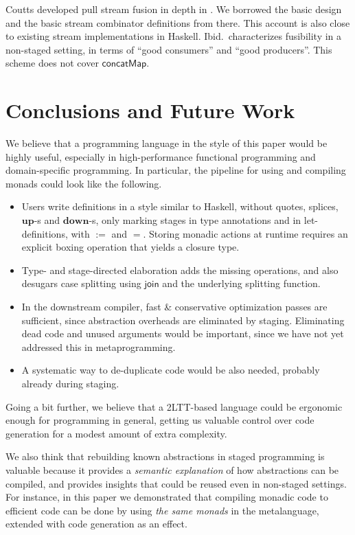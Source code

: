 \documentclass[acmsmall,screen,review,anonymous]{acmart}
\newcommand{\mit}[1]{{\mathsf{#1}}}
\newcommand{\msf}[1]{{\mathsf{#1}}}
\newcommand{\mbf}[1]{{\mathbf{#1}}}
\newcommand{\concatMap}{\msf{concatMap}}
\theoremstyle{remark}
\newcommand{\mup}{\mbf{up}}
\newcommand{\mdown}{\mbf{down}}
\newcommand{\join}{\mit{join}}
\begin{document}
Coutts developed pull stream fusion in depth in
\cite{DBLP:phd/ethos/Coutts11}. We borrowed the basic design and the basic
stream combinator definitions from there. This account is also close to existing
stream implementations in Haskell. Ibid.\ characterizes fusibility in a
non-staged setting, in terms of ``good consumers'' and ``good producers''.  This
scheme does not cover $\concatMap$.

\section{Conclusions and Future Work}

We believe that a programming language in the style of this paper would be
highly useful, especially in high-performance functional programming and
domain-specific programming. In particular, the pipeline for using and compiling
monads could look like the following.
\begin{itemize}
\item Users write definitions in a style similar to Haskell, without quotes,
      splices, $\mup$-s and $\mdown$-s, only marking stages in type annotations and
      in let-definitions, with $:=$ and $=$.  Storing monadic actions at runtime
      requires an explicit boxing operation that yields a closure type.
\item Type- and stage-directed elaboration adds the missing operations, and also desugars
      case splitting using $\join$ and the underlying splitting function.
\item In the downstream compiler, fast \& conservative optimization passes are
      sufficient, since abstraction overheads are eliminated by staging. Eliminating
      dead code and unused arguments would be important, since we have not yet addressed
      this in metaprogramming.
\item A systematic way to de-duplicate code would be also needed, probably already
      during staging.
\end{itemize}

Going a bit further, we believe that a 2LTT-based
language could be ergonomic enough for programming in general, getting us
valuable control over code generation for a modest amount of extra complexity.

We also think that rebuilding known abstractions in staged programming is
valuable because it provides a \emph{semantic explanation} of how abstractions
can be compiled, and provides insights that could be reused even in non-staged
settings. For instance, in this paper we demonstrated that compiling monadic code to
efficient code can be done by using \emph{the same monads} in the metalanguage,
extended with code generation as an effect.
\end{document}
